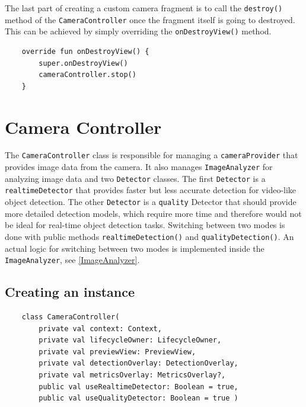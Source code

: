 The last part of creating a custom camera fragment is to call the \texttt{destroy()} method of the \texttt{CameraController} once the fragment itself is going to destroyed. This can be achieved by simply overriding the \texttt{onDestroyView()} method.

\bigskip
\begin{lstlisting}
    override fun onDestroyView() {
        super.onDestroyView()
        cameraController.stop()
    }
\end{lstlisting}
\bigskip


 
\section{Camera Controller}
\label{CameraController}

The \texttt{CameraController} class is responsible for managing a \texttt{cameraProvider} that provides image data from the camera. It also manages \texttt{ImageAnalyzer} for analyzing image data and two \texttt{Detector} classes. The first \texttt{Detector} is a \texttt{realtimeDetector} that provides faster but less accurate detection for video-like object detection. The other \texttt{Detector} is a \texttt{quality} Detector that should provide more detailed detection models, which require more time and therefore would not be ideal for real-time object detection tasks. Switching between two modes is done with public methods \texttt{realtimeDetection()} and \texttt{qualityDetection()}. An actual logic for switching between two modes is implemented inside the \texttt{ImageAnalyzer}, see \ref{ImageAnalyzer}.

\subsection{Creating an instance}

\bigskip
\begin{lstlisting}
    class CameraController(
        private val context: Context,
        private val lifecycleOwner: LifecycleOwner,
        private val previewView: PreviewView,
        private val detectionOverlay: DetectionOverlay,
        private val metricsOverlay: MetricsOverlay?,    
        public val useRealtimeDetector: Boolean = true,
        public val useQualityDetector: Boolean = true )
\end{lstlisting}
\bigskip

